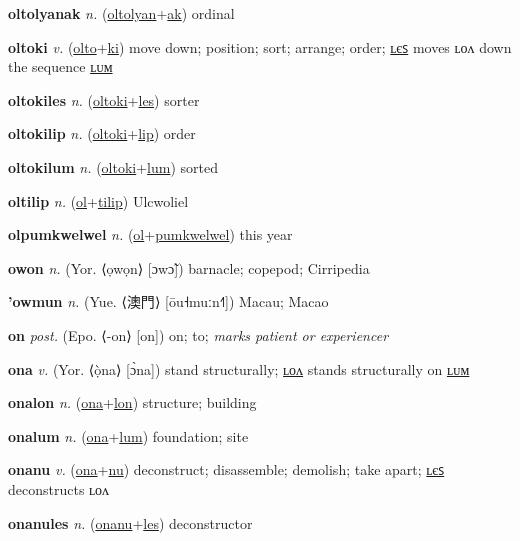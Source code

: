 \textbf{\hypertarget{oltolyanak}{oltolyanak}} \textit{n.} (\hyperlink{oltolyan}{oltolyan}+\allowbreak \hyperlink{ak}{ak})
ordinal

\textbf{\hypertarget{oltoki}{oltoki}} \textit{v.} (\hyperlink{olto}{olto}+\allowbreak \hyperlink{ki}{ki})
move down; position; sort; arrange; order; \hyperlink{oltokiles}{ʟєꜱ} moves ʟᴏᴧ down the sequence \hyperlink{oltokilum}{ʟᴜᴍ}

\textbf{\hypertarget{oltokiles}{oltokiles}} \textit{n.} (\hyperlink{oltoki}{oltoki}+\allowbreak \hyperlink{les}{les})
sorter

\textbf{\hypertarget{oltokilip}{oltokilip}} \textit{n.} (\hyperlink{oltoki}{oltoki}+\allowbreak \hyperlink{lip}{lip})
order

\textbf{\hypertarget{oltokilum}{oltokilum}} \textit{n.} (\hyperlink{oltoki}{oltoki}+\allowbreak \hyperlink{lum}{lum})
sorted

\textbf{\hypertarget{oltilip}{oltilip}} \textit{n.} (\hyperlink{ol}{ol}+\allowbreak \hyperlink{tilip}{tilip})
Ulcwoliel

\textbf{\hypertarget{olpumkwelwel}{olpumkwelwel}} \textit{n.} (\hyperlink{ol}{ol}+\allowbreak \hyperlink{pumkwelwel}{pumkwelwel})
this year

\textbf{\hypertarget{owon}{owon}} \textit{n.} (Yor. ⟨ọwọn⟩ [ɔwɔ̃])
barnacle; copepod; Cirripedia

\textbf{\hypertarget{'owmun}{'owmun}} \textit{n.} (Yue. ⟨{\chinese{}澳門}⟩ [ōu˧muːn˧˥])
Macau; Macao

\textbf{\hypertarget{on}{on}} \textit{post.} (Epo. ⟨-on⟩ [on])
on; to; \textit{marks patient or experiencer}

\textbf{\hypertarget{ona}{ona}} \textit{v.} (Yor. ⟨ọ̀na⟩ [ɔ̀na])
stand structurally; \hyperlink{onalon}{ʟᴏᴧ} stands structurally on \hyperlink{onalum}{ʟᴜᴍ}

\textbf{\hypertarget{onalon}{onalon}} \textit{n.} (\hyperlink{ona}{ona}+\allowbreak \hyperlink{lon}{lon})
structure; building

\textbf{\hypertarget{onalum}{onalum}} \textit{n.} (\hyperlink{ona}{ona}+\allowbreak \hyperlink{lum}{lum})
foundation; site

\textbf{\hypertarget{onanu}{onanu}} \textit{v.} (\hyperlink{ona}{ona}+\allowbreak \hyperlink{nu}{nu})
deconstruct; disassemble; demolish; take apart; \hyperlink{onanules}{ʟєꜱ} deconstructs ʟᴏᴧ

\textbf{\hypertarget{onanules}{onanules}} \textit{n.} (\hyperlink{onanu}{onanu}+\allowbreak \hyperlink{les}{les})
deconstructor

